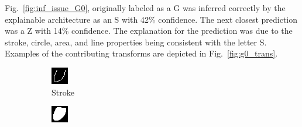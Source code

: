 \documentclass[conference]{IEEEtran}
\begin{document}
Fig.~\ref{fig:inf_issue_G0}, originally labeled as a G was inferred correctly by
the explainable architecture as an S with 42\% confidence.  The next closest
prediction was a Z with 14\% confidence.  The explanation for the prediction was
due to the stroke, circle, area, and line properties being consistent with the
letter S. Examples of the contributing transforms are depicted in
Fig.~\ref{fig:g0_trans}.

\begin{figure}[h]
    \centering
    \begin{subfigure}{.20\columnwidth}
        \centering
        \includegraphics[width=.90\textwidth]{./images/issues/excluded-T-5-stroke.png}
        \caption{Stroke}
    \end{subfigure}%
    \begin{subfigure}{.20\columnwidth}
        \centering
        \includegraphics[width=.90\textwidth]{./images/issues/excluded-T-5-area.png}

\end{subfigure}
\end{figure}
\end{document}
